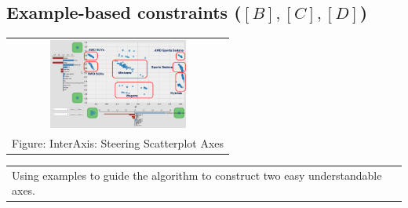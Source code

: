 \documentclass[portrait,final,a0paper]{nadiposter}
\begin{document}
\begin{poster}
{\begin{multicols}{3}
    \section*{\small{Example-based constraints (\small{$[B],[C],[D]$})}}
    \begin{center}
        \begin{tabular}{c}
            \includegraphics[height=8em]{poster_NADI_2018/images/eg_interaxis.png}\\
            \tiny{Figure: InterAxis: Steering Scatterplot Axes \cite{Kim2016InterAxis}}
        \end{tabular}
        \begin{tabular}{p{13em}}
            \quad Using examples to guide the algorithm to construct two easy understandable axes.
        \end{tabular}
    \end{center}
\end{multicols}
}

\end{poster}
\end{document}
